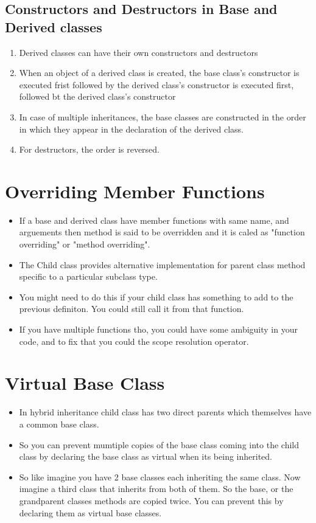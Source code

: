 \documentclass[11pt]{article}
\begin{document}
\subsection{Constructors and Destructors in Base and Derived classes}
\begin{enumerate}
	\item Derived classes can have their own constructors and destructors
	\item When an object of a derived class is created, the base class's constructor is executed frist followed by the derived class's constructor is executed first, followed bt the derived class's constructor
	\item In case of multiple inheritances, the base classes are constructed in the order in which they appear in the declaration of the derived class. 
	\item For destructors, the order is reversed. 
\end{enumerate}

\section{Overriding Member Functions}
\begin{itemize}
\item If a base and derived class have member functions with same name, and arguements then method is said to be overridden and it is caled as "function overriding" or "method overriding". 
\item The Child class provides alternative implementation for parent class method  specific to a particular subclass type. 
\item You might need to do this if your child class has something to add to the previous definiton. You could still call it from that function. 
\item If you have multiple functions tho, you could have some ambiguity in your code, and to fix that you could the scope resolution operator.
\end{itemize}


% 

\section{Virtual Base Class}
\begin{itemize}
\item In hybrid inheritance child class has two direct parents which themselves have a common base class. 
\item So you can prevent mumtiple copies of the base class coming into the child class by declaring the base class as virtual when its being inherited. 
\item So like imagine you have 2 base classes each inheriting the same class. Now imagine a third class that inherits from both of them. So the base, or the grandparent classes methods are copied twice. You can prevent this by declaring them as virtual base classes. 
\end{itemize}
\end{document}
